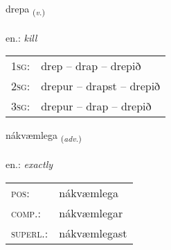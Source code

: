 \documentclass[frontgrid, backgrid]{flacards}\usepackage[]{graphicx}\usepackage[]{xcolor}
\begin{document}
\renewcommand{\flhead}{\vskip5pt \fboxsep=0pt {\small\bfseries\footnotesize Sagnorð | Verb}}
\renewcommand{\fcfoot}{\vskip5pt \fboxsep=0pt \hspace{2pt}{\small\bfseries\footnotesize 2K}}

\renewcommand{\blhead}{\vskip5pt {\small\bfseries\footnotesize Sagnorð | Verb }}
\renewcommand{\bcfoot}{\vskip5pt \hspace{2pt}{\small\bfseries\footnotesize 2K}}


{drepa \small{\textsubscript{(\textit{v.})}} \\[1ex] %
\textphonetic{[trɛːpa]} \\
en.: \emph{kill} \\  [2ex]
\renewcommand*{\arraystretch}{0.8}
\begin{tabular}{p{1cm}l}
\textsc{1sg}: & drep -- drap -- drepið \\ 
\textsc{2sg}: & drepur -- drapst -- drepið \\ 
\textsc{3sg}: & drepur -- drap -- drepið \\ 
\end{tabular}
}

\renewcommand{\flhead}{\vskip5pt \fboxsep=0pt {\small\bfseries\footnotesize Atviksorð | Adverb}}
\renewcommand{\fcfoot}{\vskip5pt \fboxsep=0pt \hspace{2pt}{\small\bfseries\footnotesize 2K}}

\renewcommand{\blhead}{\vskip5pt {\small\bfseries\footnotesize Atviksorð | Adverb }}
\renewcommand{\bcfoot}{\vskip5pt \hspace{2pt}{\small\bfseries\footnotesize 2K}}


{nákvæmlega \small{\textsubscript{(\textit{adv.})}} \\[1ex] %
\textphonetic{[nauːkʰvaimlɛɣa]} \\
en.: \emph{exactly} \\  [2ex]
\renewcommand*{\arraystretch}{0.8}
\begin{tabular}{ll}
\textsc{pos}: & nákvæmlega \\ 
\textsc{comp.}: & nákvæmlegar \\ 
\textsc{superl.}: & nákvæmlegast \\
\end{tabular}
}
\end{document}
